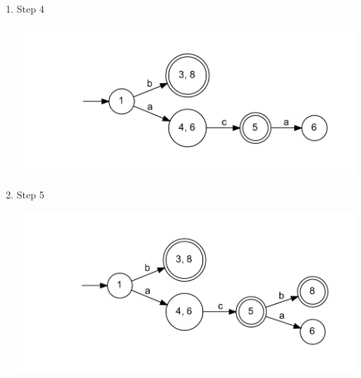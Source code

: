 \documentclass{article}
\begin{document}
\begin{enumerate}
\begin{center}
\end{center}
\item Step 4
\begin{center}
\includegraphics[width=\textwidth]{step11.dot.pdf}
\end{center}
\item Step 5
\begin{center}
\includegraphics[width=\textwidth]{step12.dot.pdf}
\end{center}
\end{enumerate}
\end{document}
